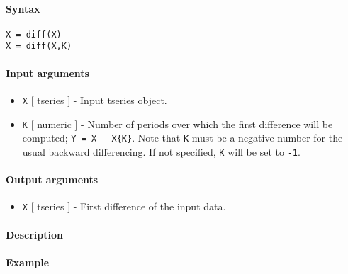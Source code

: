 


	\paragraph{Syntax}

\begin{verbatim}
X = diff(X)
X = diff(X,K)
\end{verbatim}

\paragraph{Input arguments}

\begin{itemize}
\item
  \texttt{X} {[} tseries {]} - Input tseries object.
\item
  \texttt{K} {[} numeric {]} - Number of periods over which the first
  difference will be computed; \texttt{Y = X - X\{K\}}. Note that
  \texttt{K} must be a negative number for the usual backward
  differencing. If not specified, \texttt{K} will be set to \texttt{-1}.
\end{itemize}

\paragraph{Output arguments}

\begin{itemize}
\itemsep1pt\parskip0pt
\item
  \texttt{X} {[} tseries {]} - First difference of the input data.
\end{itemize}

\paragraph{Description}

\paragraph{Example}


